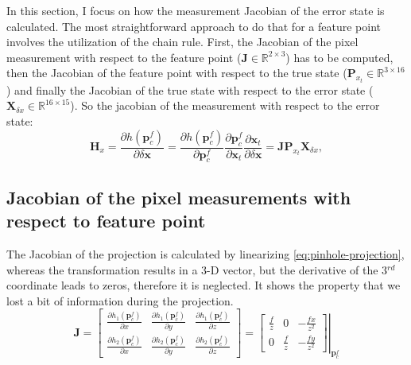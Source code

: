 In this section, I focus on how the measurement Jacobian of the error state is calculated. The most straightforward approach to do that for a feature point involves the utilization of the chain rule. First, the Jacobian of the pixel measurement with respect to the feature point ($\mathbf{J}\in\mathbb{R}^{2\times3}$) has to be computed, then the Jacobian of the feature point with respect to the true state ($\mathbf{P}_{x_t}\in\mathbb{R}^{3\times 16}$) and finally the Jacobian of the true state with respect to the error state ($\mathbf{X}_{\delta x}\in\mathbb{R}^{16\times 15}$). So the jacobian of the measurement with respect to the error state:
\begin{equation}
    \mathbf{H}_x=\frac{\partial h(\mathbf{p}_c^f)}{\partial\delta\mathbf{x}}= 
    \frac{\partial h(\mathbf{p}_c^f)}{\partial\mathbf{p}_c^f}
    \frac{\partial\mathbf{p}_c^f}{\partial\mathbf{x}_t}
    \frac{\partial\mathbf{x}_t}{\partial\delta\mathbf{x}} =\mathbf{J}\mathbf{P}_{x_t}\mathbf{X}_{\delta x},
\end{equation} 

\subsection*{Jacobian of the pixel measurements with respect to feature point}

The Jacobian of the projection is calculated by linearizing \eqref{eq:pinhole-projection}, whereas the transformation results in a 3-D vector, but the derivative of the 3$^{rd}$ coordinate leads to zeros, therefore it is neglected. It shows the property that we lost a bit of information during the projection.
\begin{equation}
    \mathbf{J}=\begin{bmatrix}
        \frac{\partial h_1(\mathbf{p}_c^f)}{\partial x} & \frac{\partial h_1(\mathbf{p}_c^f)}{\partial y} & \frac{\partial h_1(\mathbf{p}_c^f)}{\partial z} \\
        \frac{\partial h_2(\mathbf{p}_c^f)}{\partial x} & \frac{\partial h_2(\mathbf{p}_c^f)}{\partial y} & \frac{\partial h_2(\mathbf{p}_c^f)}{\partial z}
    \end{bmatrix} = \left.\begin{bmatrix}
        \frac{f}{z} & 0 & -\frac{fx}{z^2} \\
        0 & \frac{f}{z} & -\frac{fy}{z^2}
    \end{bmatrix}\right\vert_{\mathbf{p}_c^f}
    \label{eq:p-der-by-xt}
\end{equation}

